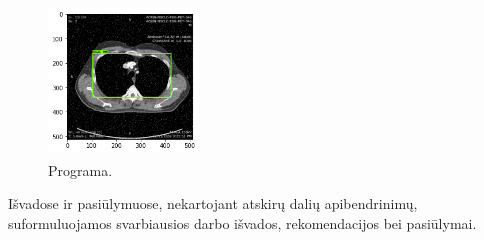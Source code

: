 \documentclass{VUMIFInfKursinis}
\begin{document}
\begin{figure}[ht]
  \includegraphics[width=4cm,height=4cm,keepaspectratio]{result1.png}
  \caption{Programa.}
  \label{fig:kaukė1}
\end{figure}

Išvadose ir pasiūlymuose, nekartojant atskirų dalių apibendrinimų,
suformuluojamos svarbiausios darbo išvados, rekomendacijos bei pasiūlymai.

\printbibliography[heading=bibintoc] %
\end{document}
